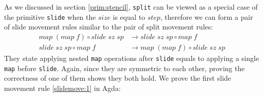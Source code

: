 \documentclass{l4proj}
\begin{document}
As we discussed in section \ref{prim:stencil}, \texttt{split} can be viewed as a special case of the primitive \texttt{slide} when the $size$ is equal to $step$, therefore we can form a pair of slide movement rules similar to the pair of split movement rules:
\begin{align}
    \label{slidemove:1}
    map\;(map\; f) \circ slide\; sz\; sp &\to slide\; sz\; sp \circ map\; f \\
    \label{slidemove:2}
    slide\; sz\; sp \circ map\; f &\to map\;(map\; f) \circ slide\; sz\; sp
\end{align}
They state applying nested \texttt{map} operations after \texttt{slide} equals to applying a single \texttt{map} before \texttt{slide}. Again, since they are symmetric to each other, proving the correctness of one of them shows they both hold. We prove the first slide movement rule \ref{slidemove:1} in Agda:
\newpage %
\end{document}
